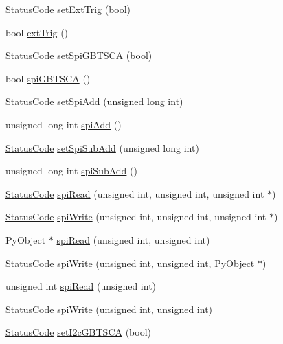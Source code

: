 \begin{DoxyCompactItemize}
\item 
\hyperlink{classStatusCode}{Status\+Code} \hyperlink{classSeqPGA_a9744b6cff04738474556cc2153af19de}{set\+Ext\+Trig} (bool)
\item 
bool \hyperlink{classSeqPGA_ae2e0917c379649d106539cc3b8b9ca3c}{ext\+Trig} ()
\item 
\hyperlink{classStatusCode}{Status\+Code} \hyperlink{classSeqPGA_ae5449d6970bffd8de3670a8a1ce6942d}{set\+Spi\+G\+B\+T\+S\+CA} (bool)
\item 
bool \hyperlink{classSeqPGA_a2eadc7868d61ff79ea566b3fbfd977a5}{spi\+G\+B\+T\+S\+CA} ()
\item 
\hyperlink{classStatusCode}{Status\+Code} \hyperlink{classSeqPGA_ac998ce3a6d9b5f2e88cc8393f8c1df53}{set\+Spi\+Add} (unsigned long int)
\item 
unsigned long int \hyperlink{classSeqPGA_af31a6428f365c1f8ded0ee381d249cde}{spi\+Add} ()
\item 
\hyperlink{classStatusCode}{Status\+Code} \hyperlink{classSeqPGA_a5db205f213770dd3fb3fcfb8ff7981df}{set\+Spi\+Sub\+Add} (unsigned long int)
\item 
unsigned long int \hyperlink{classSeqPGA_a6422961edd45abad31e6d79e0564c48f}{spi\+Sub\+Add} ()
\item 
\hyperlink{classStatusCode}{Status\+Code} \hyperlink{classSeqPGA_ab3d0e5e5d4014bc7a92588a76b8713d4}{spi\+Read} (unsigned int, unsigned int, unsigned int $\ast$)
\item 
\hyperlink{classStatusCode}{Status\+Code} \hyperlink{classSeqPGA_ad4421841ce4ce8b88ad13f63216f0743}{spi\+Write} (unsigned int, unsigned int, unsigned int $\ast$)
\item 
Py\+Object $\ast$ \hyperlink{classSeqPGA_a61df84df1bd134d1bda2133d82bafb2e}{spi\+Read} (unsigned int, unsigned int)
\item 
\hyperlink{classStatusCode}{Status\+Code} \hyperlink{classSeqPGA_a7b8af951501ccd0f763e131276c543ad}{spi\+Write} (unsigned int, unsigned int, Py\+Object $\ast$)
\item 
unsigned int \hyperlink{classSeqPGA_a654a40dc597227e59458631f49ff598f}{spi\+Read} (unsigned int)
\item 
\hyperlink{classStatusCode}{Status\+Code} \hyperlink{classSeqPGA_a3cc382925053df4b2fc7d3a99b4def20}{spi\+Write} (unsigned int, unsigned int)
\item 
\hyperlink{classStatusCode}{Status\+Code} \hyperlink{classSeqPGA_aef7911620b07d8aeef2a9ec95fa58ca4}{set\+I2c\+G\+B\+T\+S\+CA} (bool)
\item 

\end{DoxyCompactItemize}

